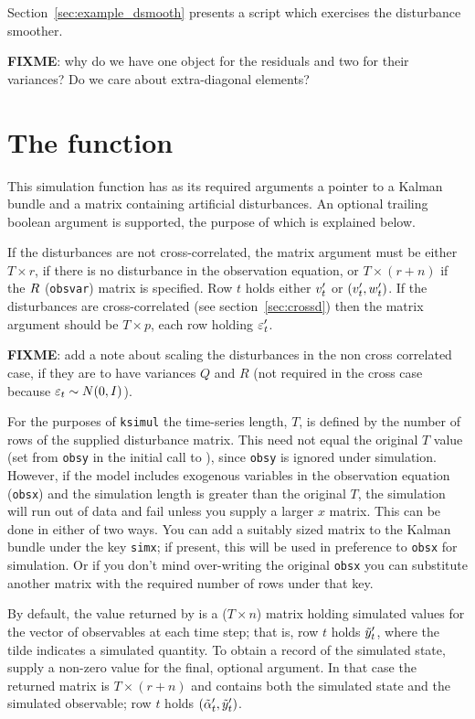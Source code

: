 \documentclass[a4paper]{article}
\begin{document}
Section~\ref{sec:example_dsmooth} presents a script which exercises
the disturbance smoother.

\textbf{FIXME}: why do we have one object for the residuals and  two
for their variances? Do we care about extra-diagonal elements?

\section{The  function}
\label{sec:ksimul}

This simulation function has as its required arguments a pointer to a
Kalman bundle and a matrix containing artificial disturbances. An
optional trailing boolean argument is supported, the purpose of which
is explained below.

If the disturbances are not cross-correlated, the matrix argument must
be either $T \times r$, if there is no disturbance in the observation
equation, or $T \times (r+n)$ if the $R$ (\texttt{obsvar})
matrix is specified. Row $t$ holds either $v_t'$ or
$(v_t', w_t')$.  If the disturbances are
cross-correlated (see section~\ref{sec:crossd}) then the matrix
argument should be $T \times p$, each row holding $\varepsilon_t'$.

\textbf{FIXME}: add a note about scaling the disturbances in the non
cross correlated case, if they are to have variances $Q$ and
$R$ (not required in the cross case because
$\varepsilon_t \sim N(0, I)$).

For the purposes of \texttt{ksimul} the time-series length, $T$, is
defined by the number of rows of the supplied disturbance matrix. This
need not equal the original $T$ value (set from \texttt{obsy} in the
initial call to ), since \texttt{obsy} is ignored under
simulation. However, if the model includes exogenous variables in the
observation equation (\texttt{obsx}) and the simulation length is
greater than the original $T$, the simulation will run out of data and
fail unless you supply a larger $x$ matrix.  This can be done in
either of two ways. You can add a suitably sized matrix to the Kalman
bundle under the key \texttt{simx}; if present, this will be used in
preference to \texttt{obsx} for simulation. Or if you don't mind
over-writing the original \texttt{obsx} you can substitute another
matrix with the required number of rows under that key.

By default, the value returned by  is a ($T \times n$)
matrix holding simulated values for the vector of observables at each
time step; that is, row $t$ holds $\tilde{y}_t'$, where the tilde
indicates a simulated quantity.  To obtain a record of the simulated
state, supply a non-zero value for the final, optional argument. In
that case the returned matrix is $T \times (r+n)$ and contains both
the simulated state and the simulated observable; row $t$ holds
$(\tilde{\alpha}_t', \tilde{y}_t')$.
\end{document}
